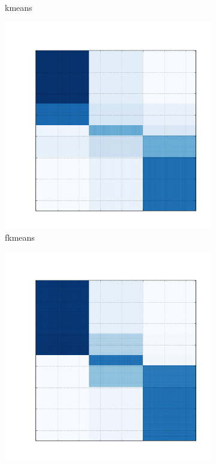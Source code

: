 \documentclass[10pt]{beamer}
\begin{document}
\begin{frame}
\begin{figure}[H]
\begin{subfigure}[b]{0.13\textwidth}
          \caption*{kmeans}
      \end{subfigure}
      \begin{subfigure}[b]{0.13\textwidth}
          \includegraphics[width=\textwidth]{img/e-reconstruction-fkmeans.png}
          \caption*{fkmeans}
      \end{subfigure}
      \begin{subfigure}[b]{0.13\textwidth}
          \includegraphics[width=\textwidth]{img/e-reconstruction-onmtf.png}

\end{subfigure}
\end{figure}
\end{frame}
\end{document}
